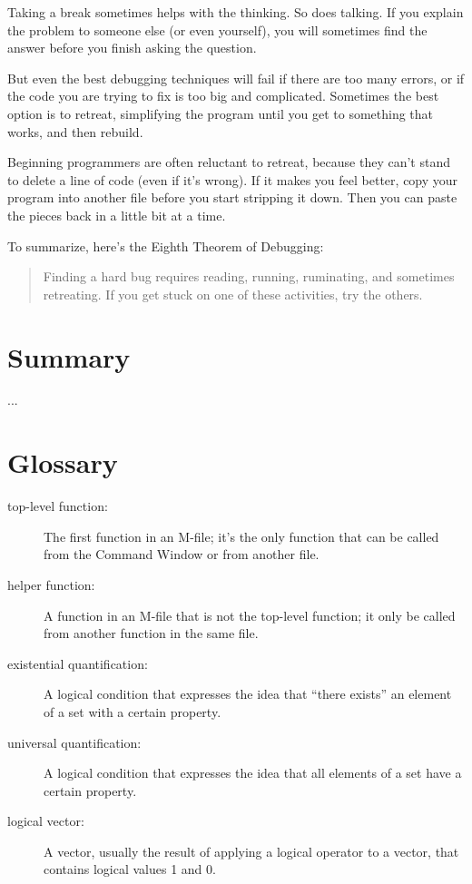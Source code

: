 
Taking a break sometimes helps with the thinking.  So does talking.
If you explain the problem to someone else (or even yourself), you
will sometimes find the answer before you finish asking the question.

But even the best debugging techniques will fail if there are too many
errors, or if the code you are trying to fix is too big and
complicated.  Sometimes the best option is to retreat, simplifying the
program until you get to something that works, and then rebuild.

Beginning programmers are often reluctant to retreat, because
they can't stand to delete a line of code (even if it's wrong).
If it makes you feel better, copy your program into another file
before you start stripping it down.  Then you can paste the pieces
back in a little bit at a time.


To summarize, here's the Eighth Theorem of Debugging:

\begin{quote}
Finding a hard bug requires reading, running, ruminating,
and sometimes retreating.  If you get stuck on one of these
activities, try the others.
\end{quote}

\section{Summary}
...

\section{Glossary}

\begin{description}

\item[top-level function:]  The first function in an M-file;
it's the only function that can be called from the Command
Window or from another file.

\item[helper function:] A function in an M-file that is not
the top-level function; it only be called from another function
in the same file.

\item[existential quantification:] A logical condition that expresses
the idea that ``there exists'' an element of a set with a certain
property.

\item[universal quantification:] A logical condition that expresses
the idea that all elements of a set have a certain property.

\item[logical vector:] A vector, usually the result of applying a logical
operator to a vector, that contains logical values 1 and 0.


\end{description}




